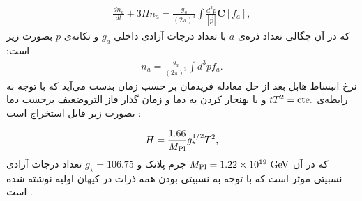 \documentclass[a4paper]{book}
\begin{document}
\par
\vspace{-0.5cm}
{\footnotesize\begin{align}
	\frac{dn_a}{dt}+3Hn_a = \frac{g_a}{(2\pi)^3} \int \frac{d^3p}{|\vec{p}|} \boldsymbol{C}[f_a],
	\label{eq:boltzamnn}
\end{align}}
که در آن چگالی تعداد ذره‌ی {\footnotesize$a$} با تعداد درجات آزادی داخلی {\footnotesize$g_a$} و تکانه‌ی {\footnotesize$p$} بصورت زیر است:
{\footnotesize\begin{align}
	n_a=\frac{g_a}{(2\pi)^3}\int d^3p f_a.
	\label{eq:number-density}
\end{align}}
نرخ انبساط هابل بعد از حل معادله فریدمان بر حسب زمان بدست می‌آید که با توجه به رابطه‌ی {\footnotesize$tT^2={\rm cte.}$} و با بهنجار کردن به دما و زمان گذار فاز التروضعیف برحسب دما بصورت زیر قابل استخراج است \cite{Kolb:1990vq}:
\par
\vspace{-0.5cm}
{\footnotesize\begin{align}
	H=\frac{1.66}{M_{\rm Pl}}g_{\star}^{1/2}T^2,
\end{align}}
که در آن {\footnotesize$M_{\rm Pl}=1.22\times 10^{19}\ {\rm GeV}$} جرم پلانک و {\footnotesize$g_{\star}=106.75$} تعداد درجات آزادی نسبیتی موثر است که با توجه به نسبیتی بودن همه ذرات در کیهان اولیه نوشته شده است \cite{Husdal:2016haj}.
\end{document}
